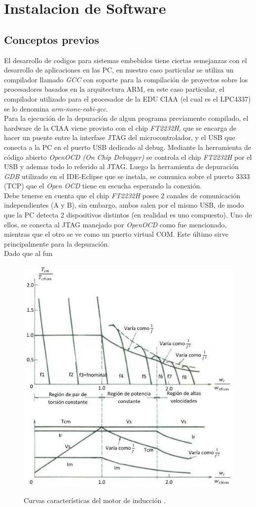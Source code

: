 \documentclass[conference]{IEEEtran}
\begin{document}
\section{Instalacion de Software}
\subsection{Conceptos previos}
El desarrollo de codigos para sistemas embebidos tiene ciertas semejanzas con el desarrollo de aplicaciones en las PC, en nuestro caso particular se utiliza un compilador llamado \textit{GCC} con soporte para la compilación de proyectos sobre los procesadores basados en la arquitectura ARM, en este caso particular, el compilador utilizado para el procesador de la EDU CIAA (el cual es el LPC4337) se lo denomina \textit{arm-none-eabi-gcc}.\\
Para la ejecución de la depuración de algun programa previamente compilado, el hardware de la CIAA viene provisto con el chip \textit{FT2232H}, que se encarga de hacer un puente entre la interfase JTAG del microcontrolador, y el USB que conecta a la PC en el puerto USB dedicado al debug. Mediante la herramienta de código abierto \textit{OpenOCD (On Chip Debugger)} se controla el chip \textit{FT2232H} por el USB y ademas todo lo referido al JTAG. Luego la herramienta de depuración \textit{GDB} utilizado en el IDE-Eclipse que se instala, se comunica sobre el puerto 3333 (TCP) que el \textit{Open OCD} tiene en escucha esperando la conexión.\\
Debe tenerse en cuenta que el chip \textit{FT2232H} posee 2 canales de comunicación independientes (A y B), sin embargo, ambos salen por el mismo USB, de modo que la PC detecta 2 dispositivos distintos (en realidad es uno compuesto). Uno de ellos, se conecta al JTAG manejado por \textit{OpenOCD} como fue mencionado, mientras que el otro se ve como un puerto virtual COM. Este último sirve principalmente para la depuración.\\
Dado que al fun

\begin{figure}[!t]
\centering
\includegraphics[width=8 cm]{figuras/CurvasMotorInduc.jpeg}\\
\caption{Curvas características del motor de inducción \cite{Mohan}.}
\label{fig_V/F}
\end{figure}
\end{document}
